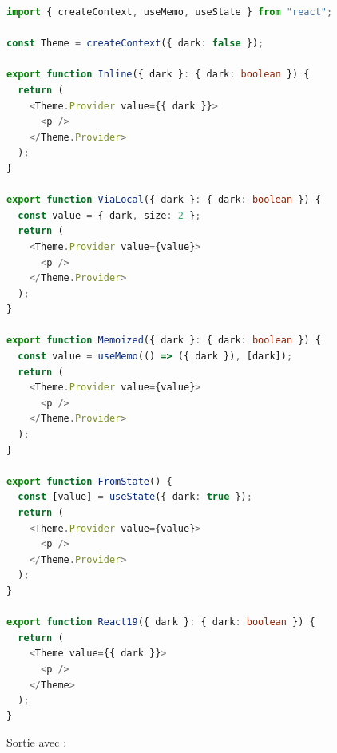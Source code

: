\begin{lstlisting}[language=TypeScript,caption={Cinq providers (\file{/tmp/ch18/ctx.tsx})},label={lst:regles-etat-ctx-ex}]
import { createContext, useMemo, useState } from "react";

const Theme = createContext({ dark: false });

export function Inline({ dark }: { dark: boolean }) {
  return (
    <Theme.Provider value={{ dark }}>
      <p />
    </Theme.Provider>
  );
}

export function ViaLocal({ dark }: { dark: boolean }) {
  const value = { dark, size: 2 };
  return (
    <Theme.Provider value={value}>
      <p />
    </Theme.Provider>
  );
}

export function Memoized({ dark }: { dark: boolean }) {
  const value = useMemo(() => ({ dark }), [dark]);
  return (
    <Theme.Provider value={value}>
      <p />
    </Theme.Provider>
  );
}

export function FromState() {
  const [value] = useState({ dark: true });
  return (
    <Theme.Provider value={value}>
      <p />
    </Theme.Provider>
  );
}

export function React19({ dark }: { dark: boolean }) {
  return (
    <Theme value={{ dark }}>
      <p />
    </Theme>
  );
}
\end{lstlisting}

Sortie avec  :

